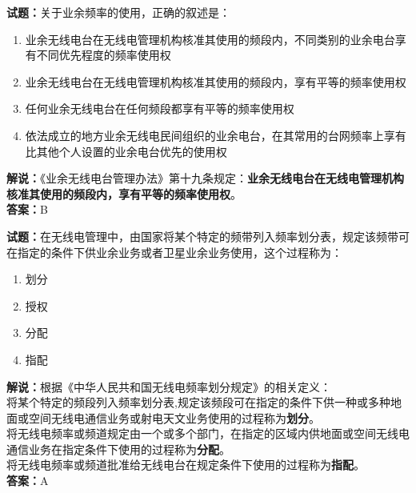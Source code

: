\documentclass{ctexbook}
\begin{document}
\vspace{\baselineskip}

\noindent\textbf{试题：}关于业余频率的使用，正确的叙述是：
\begin{enumerate}[leftmargin=3em]
  \item 业余无线电台在无线电管理机构核准其使用的频段内，不同类别的业余电台享有不同优先程度的频率使用权
  \item 业余无线电台在无线电管理机构核准其使用的频段内，享有平等的频率使用权
  \item 任何业余无线电台在任何频段都享有平等的频率使用权
  \item 依法成立的地方业余无线电民间组织的业余电台，在其常用的台网频率上享有比其他个人设置的业余电台优先的使用权
\end{enumerate}
\noindent\textbf{解说：}《业余无线电台管理办法》第十九条规定：\textbf{业余无线电台在无线电管理机构核准其使用的频段内，享有平等的频率使用权}。\\\noindent\textbf{答案：}B

\vspace{\baselineskip}

\noindent\textbf{试题：}在无线电管理中，由国家将某个特定的频带列入频率划分表，规定该频带可在指定的条件下供业余业务或者卫星业余业务使用，这个过程称为：
\begin{enumerate}[leftmargin=3em]
  \item 划分
  \item 授权
  \item 分配
  \item 指配
\end{enumerate}
\noindent\textbf{解说：}根据《中华人民共和国无线电频率划分规定》的相关定义：\\将某个特定的频段列入频率划分表,规定该频段可在指定的条件下供一种或多种地面或空间无线电通信业务或射电天文业务使用的过程称为\textbf{划分}。\\将无线电频率或频道规定由一个或多个部门，在指定的区域内供地面或空间无线电通信业务在指定条件下使用的过程称为\textbf{分配}。\\将无线电频率或频道批准给无线电台在规定条件下使用的过程称为\textbf{指配}。\\
\textbf{答案：}A

\vspace{\baselineskip}
\end{document}
